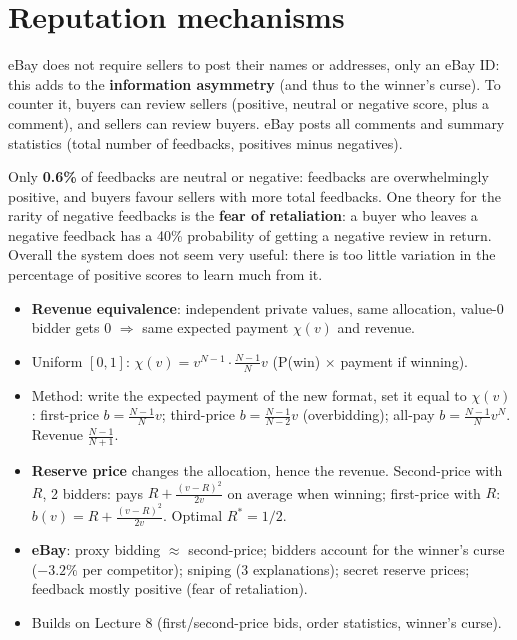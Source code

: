 \documentclass[11pt,a4paper,openany]{book}
\begin{document}
\section{Reputation mechanisms}

\begin{propbox}[title=Feedback on eBay]
eBay does not require sellers to post their names or addresses, only an eBay ID: this adds to
the \textbf{information asymmetry} (and thus to the winner's curse). To counter it, buyers can
review sellers (positive, neutral or negative score, plus a comment), and sellers can review
buyers. eBay posts all comments and summary statistics (total number of feedbacks, positives
minus negatives).
\end{propbox}

\begin{warnbox}[title=Does it work?]
Only \textbf{0.6\%} of feedbacks are neutral or negative: feedbacks are overwhelmingly
positive, and buyers favour sellers with more total feedbacks. One theory for the rarity of
negative feedbacks is the \textbf{fear of retaliation}: a buyer who leaves a negative feedback
has a 40\% probability of getting a negative review in return. Overall the system does not
seem very useful: there is too little variation in the percentage of positive scores to learn
much from it.
\end{warnbox}

\begin{keybox}[title=Exam recap]
\begin{itemize}
  \item \textbf{Revenue equivalence}: independent private values, same allocation, value-0
        bidder gets 0 $\Rightarrow$ same expected payment $\chi(v)$ and revenue.
  \item Uniform $[0,1]$: $\chi(v) = v^{N-1}\cdot\frac{N-1}{N}v$ (P(win) $\times$ payment if
        winning).
  \item Method: write the expected payment of the new format, set it equal to $\chi(v)$:
        first-price $b = \frac{N-1}{N}v$; third-price $b = \frac{N-1}{N-2}v$
        (overbidding); all-pay $b = \frac{N-1}{N}v^N$. Revenue $\frac{N-1}{N+1}$.
  \item \textbf{Reserve price} changes the allocation, hence the revenue. Second-price with
        $R$, 2 bidders: pays $R + \frac{(v-R)^2}{2v}$ on average when winning; first-price
        with $R$: $b(v) = R + \frac{(v-R)^2}{2v}$. Optimal $R^* = 1/2$.
  \item \textbf{eBay}: proxy bidding $\approx$ second-price; bidders account for the
        winner's curse ($-3.2\%$ per competitor); sniping (3 explanations); secret reserve
        prices; feedback mostly positive (fear of retaliation).
  \item Builds on Lecture 8 (first/second-price bids, order statistics, winner's curse).
\end{itemize}
\end{keybox}
\end{document}
